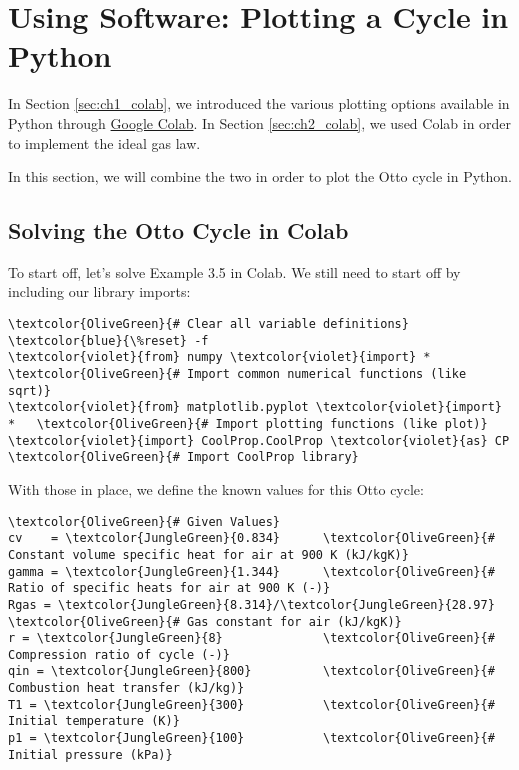 \section{Using Software: Plotting a Cycle in Python}
In Section \ref{sec:ch1_colab}, we introduced the various plotting options available in Python through \href{https://colab.research.google.com}{Google Colab}.  In Section \ref{sec:ch2_colab}, we used Colab in order to implement the ideal gas law.

In this section, we will combine the two in order to plot the Otto cycle in Python.

\subsection{Solving the Otto Cycle in Colab}
To start off, let's solve Example 3.5 in Colab.  We still need to start off by including our library imports:

\begin{Verbatim}[commandchars=\\\{\}]
\textcolor{OliveGreen}{# Clear all variable definitions}
\textcolor{blue}{\%reset} -f                         
\textcolor{violet}{from} numpy \textcolor{violet}{import} *               \textcolor{OliveGreen}{# Import common numerical functions (like sqrt)}
\textcolor{violet}{from} matplotlib.pyplot \textcolor{violet}{import} *   \textcolor{OliveGreen}{# Import plotting functions (like plot)}
\textcolor{violet}{import} CoolProp.CoolProp \textcolor{violet}{as} CP    \textcolor{OliveGreen}{# Import CoolProp library}
\end{Verbatim}

With those in place, we define the known values for this Otto cycle:
\begin{Verbatim}[commandchars=\\\{\}]
\textcolor{OliveGreen}{# Given Values}                
cv    = \textcolor{JungleGreen}{0.834}      \textcolor{OliveGreen}{# Constant volume specific heat for air at 900 K (kJ/kgK)}
gamma = \textcolor{JungleGreen}{1.344}      \textcolor{OliveGreen}{# Ratio of specific heats for air at 900 K (-)}
Rgas = \textcolor{JungleGreen}{8.314}/\textcolor{JungleGreen}{28.97} \textcolor{OliveGreen}{# Gas constant for air (kJ/kgK)}
r = \textcolor{JungleGreen}{8}              \textcolor{OliveGreen}{# Compression ratio of cycle (-)}
qin = \textcolor{JungleGreen}{800}          \textcolor{OliveGreen}{# Combustion heat transfer (kJ/kg)}
T1 = \textcolor{JungleGreen}{300}           \textcolor{OliveGreen}{# Initial temperature (K)}
p1 = \textcolor{JungleGreen}{100}           \textcolor{OliveGreen}{# Initial pressure (kPa)}
\end{Verbatim}


